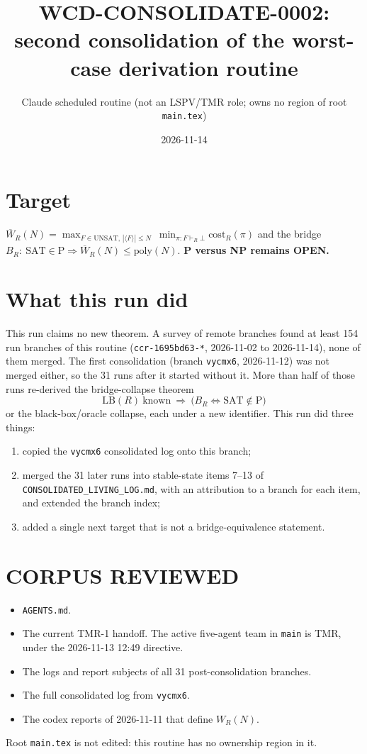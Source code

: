 \documentclass[11pt]{article}
\title{WCD-CONSOLIDATE-0002: second consolidation of the worst-case derivation routine}
\author{Claude scheduled routine (not an LSPV/TMR role; owns no region of root \texttt{main.tex})}
\date{2026-11-14}
\begin{document}
\maketitle

\section*{Target}
$\overline W_R(N)=\max_{F\in\mathrm{UNSAT},\,|\langle F\rangle|\le N}\ \min_{\pi:F\vdash_R\bot}\mathrm{cost}_R(\pi)$
and the bridge $B_R:\ \mathrm{SAT}\in\mathrm P\Rightarrow\overline W_R(N)\le\mathrm{poly}(N)$.
\textbf{P versus NP remains OPEN.}

\section*{What this run did}
This run claims no new theorem. A survey of remote branches found at least 154 run branches
of this routine (\texttt{ccr-1695bd63-*}, 2026-11-02 to 2026-11-14), none of them merged. The
first consolidation (branch \texttt{vycmx6}, 2026-11-12) was not merged either, so the 31 runs
after it started without it. More than half of those runs re-derived the bridge-collapse
theorem
\[
\mathrm{LB}(R)\ \text{known}\ \Longrightarrow\ \bigl(B_R\iff \mathrm{SAT}\notin\mathrm P\bigr)
\]
or the black-box/oracle collapse, each under a new identifier. This run did three things:
\begin{enumerate}
\item copied the \texttt{vycmx6} consolidated log onto this branch;
\item merged the 31 later runs into stable-state items 7--13 of
  \texttt{CONSOLIDATED\_LIVING\_LOG.md}, with an attribution to a branch for each item, and
  extended the branch index;
\item added a single next target that is not a bridge-equivalence statement.
\end{enumerate}

\section*{CORPUS REVIEWED}
\begin{itemize}
\item \texttt{AGENTS.md}.
\item The current TMR-1 handoff. The active five-agent team in \texttt{main} is TMR, under the 2026-11-13 12:49 directive.
\item The logs and report subjects of all 31 post-consolidation branches.
\item The full consolidated log from \texttt{vycmx6}.
\item The codex reports of 2026-11-11 that define $W_R(N)$.
\end{itemize}
Root \texttt{main.tex} is not edited: this routine has no ownership region in it.
\end{document}
